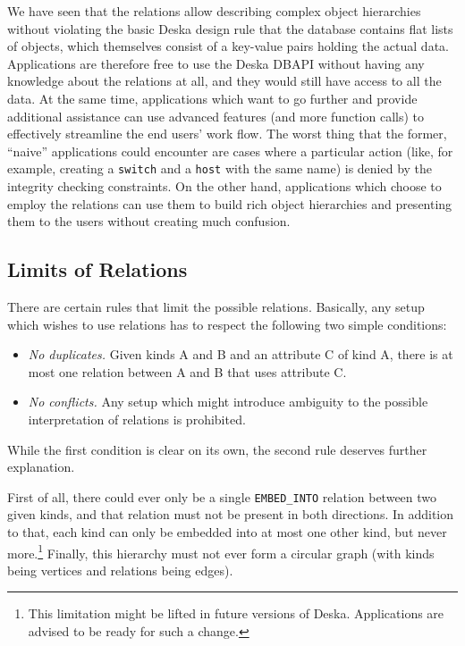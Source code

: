 \documentclass[deska]{subfiles}
\begin{document}
We have seen that the relations allow describing complex object hierarchies without violating the basic Deska design
rule that the database contains flat lists of objects, which themselves consist of a key-value pairs holding the actual
data.  Applications are therefore free to use the Deska DBAPI without having any knowledge about the relations at all,
and they would still have access to all the data.  At the same time, applications which want to go further and provide
additional assistance can use advanced features (and more function calls) to effectively streamline the end users' work
flow.  The worst thing that the former, ``naive'' applications could encounter are cases where a particular action
(like, for example, creating a {\tt switch} and a {\tt host} with the same name) is denied by the integrity checking
constraints.  On the other hand, applications which choose to employ the relations can use them to build rich object
hierarchies and presenting them to the users without creating much confusion.

\subsection{Limits of Relations}

There are certain rules that limit the possible relations.  Basically, any setup which wishes to use relations has to
respect the following two simple conditions:

\begin{itemize}
    \item {\em No duplicates.} Given kinds A and B and an attribute C of kind A, there is at most one relation between A
        and B that uses attribute C.
    \item {\em No conflicts.} Any setup which might introduce ambiguity to the possible interpretation of relations is
        prohibited.
\end{itemize}

While the first condition is clear on its own, the second rule deserves further explanation.

First of all, there could ever only be a single {\tt EMBED\_INTO} relation between two given kinds, and that relation
must not be present in both directions.  In addition to that, each kind can only be embedded into at most one other
kind, but never more.\footnote{This limitation might be lifted in future versions of Deska.  Applications are advised to
be ready for such a change.}  Finally, this hierarchy must not ever form a circular graph (with kinds being vertices and
relations being edges).
\end{document}
